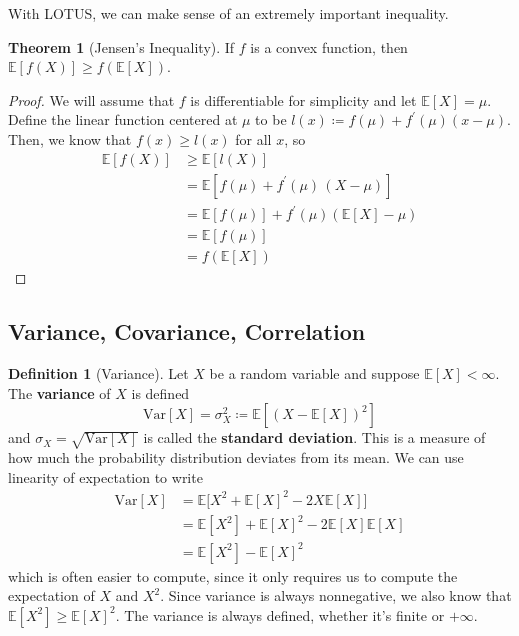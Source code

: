\documentclass{article}
\theoremstyle{definition}
\newtheorem{theorem}{Theorem}[section]
\theoremstyle{remark}
\theoremstyle{definition}
\newtheorem{definition}{Definition}[section]
\begin{document}
With LOTUS, we can make sense of an extremely important inequality. 

\begin{theorem}[Jensen's Inequality]
If $f$ is a convex function, then $\mathbb{E}[f(X)] \geq f (\mathbb{E}[X])$. 
\end{theorem}
\begin{proof}
We will assume that $f$ is differentiable for simplicity and let $\mathbb{E}[X] = \mu$. Define the linear function centered at $\mu$ to be $l(x) \coloneqq f(\mu) + f^\prime (\mu) (x - \mu)$. Then, we know that $f(x) \geq l(x)$ for all $x$, so 
\begin{align*}
    \mathbb{E}[f(X)] & \geq \mathbb{E}[ l(X)] \\ 
    & = \mathbb{E}[f(\mu) + f^\prime (\mu) \, (X - \mu)] \\
    & = \mathbb{E}[f(\mu)] + f^\prime (\mu) ( \mathbb{E}[X] - \mu) \\
    & = \mathbb{E}[f(\mu)] \\
    & = f(\mathbb{E}[X])
\end{align*}
\end{proof}

\subsection{Variance, Covariance, Correlation}

\begin{definition}[Variance]
Let $X$ be a random variable and suppose $\mathbb{E}[X] < \infty$. The \textbf{variance} of $X$ is defined 
\[\mathrm{Var}[X] = \sigma^2_X \coloneqq \mathbb{E} [ (X - \mathbb{E}[X])^2 ]\]
and $\sigma_X = \sqrt{\mathrm{Var}[X]}$ is called the \textbf{standard deviation}. This is a measure of how much the probability distribution deviates from its mean. We can use linearity of expectation to write 
\begin{align*}
    \mathrm{Var}[X] & = \mathbb{E} \big[ X^2 + \mathbb{E}[X]^2 - 2 X \mathbb{E}[X] \big] \\
    & = \mathbb{E}[X^2] + \mathbb{E}[X]^2 - 2 \mathbb{E}[X] \mathbb{E}[X] \\
    & = \mathbb{E}[X^2] - \mathbb{E}[X]^2
\end{align*}
which is often easier to compute, since it only requires us to compute the expectation of $X$ and $X^2$. Since variance is always nonnegative, we also know that $\mathbb{E}[X^2] \geq \mathbb{E}[X]^2$. The variance is always defined, whether it's finite or $+\infty$. 
\end{definition}
\end{document}
